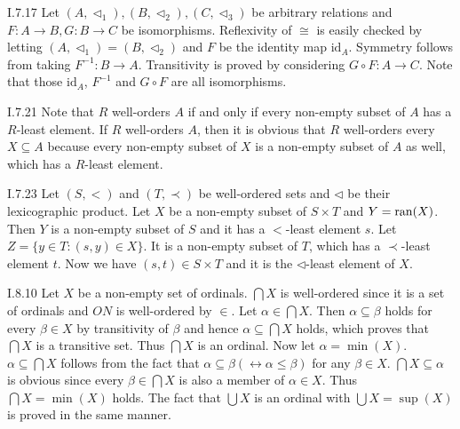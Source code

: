 \documentclass[12pt]{article}
\begin{document}
\begin{customthm}{I.7.17}
  Let $(A,\triangleleft_1),(B,\triangleleft_2),(C,\triangleleft_3)$ be arbitrary relations and $F:A\rightarrow B,G:B\rightarrow C$ be isomorphisms. Reflexivity of $\cong$ is easily checked by letting $(A,\triangleleft_1)=(B,\triangleleft_2)$ and $F$ be the identity map $\mathrm{id}_A$. Symmetry follows from taking $F^{-1}:B\rightarrow A$. Transitivity is proved by considering $G\circ F:A\rightarrow C$. Note that those $\mathrm{id}_A$, $F^{-1}$ and $G\circ F$ are all isomorphisms.
\end{customthm}

\begin{customthm}{I.7.21}
  Note that $R$ well-orders $A$ if and only if every non-empty subset of $A$ has a $R$-least element. If $R$ well-orders $A$, then it is obvious that $R$ well-orders every $X\subseteq A$ because every non-empty subset of $X$ is a non-empty subset of $A$ as well, which has a $R$-least element.
\end{customthm}

\begin{customthm}{I.7.23}
  Let $(S,<)$ and $(T,\prec)$ be well-ordered sets and $\triangleleft$ be their lexicographic product. Let $X$ be a non-empty subset of $S\times T$ and $Y = \mathop{\mathrm{ran}}(X)$. Then $Y$ is a non-empty subset of $S$ and it has a $<$-least element $s$. Let $Z=\{y\in T:(s,y)\in X\}$. It is a non-empty subset of $T$, which has a $\prec$-least element $t$. Now we have $(s,t)\in S\times T$ and it is the $\triangleleft$-least element of $X$.
\end{customthm}

\begin{customthm}{I.8.10}
  Let $X$ be a non-empty set of ordinals. $\bigcap X$ is well-ordered since it is a set of ordinals and $ON$ is well-ordered by $\in$. Let $\alpha\in\bigcap X$. Then $\alpha\subseteq\beta$ holds for every $\beta\in X$ by transitivity of $\beta$ and hence $\alpha\subseteq\bigcap X$ holds, which proves that $\bigcap X$ is a transitive set. Thus $\bigcap X$ is an ordinal. Now let $\alpha=\min(X)$. $\alpha\subseteq\bigcap X$ follows from the fact that $\alpha\subseteq\beta(\leftrightarrow\alpha\leq\beta)$ for any $\beta\in X$. $\bigcap X\subseteq\alpha$ is obvious since every $\beta\in\bigcap X$ is also a member of $\alpha\in X$. Thus $\bigcap X=\min(X)$ holds. The fact that $\bigcup X$ is an ordinal with $\bigcup X=\sup(X)$ is proved in the same manner.
\end{customthm}
\end{document}
